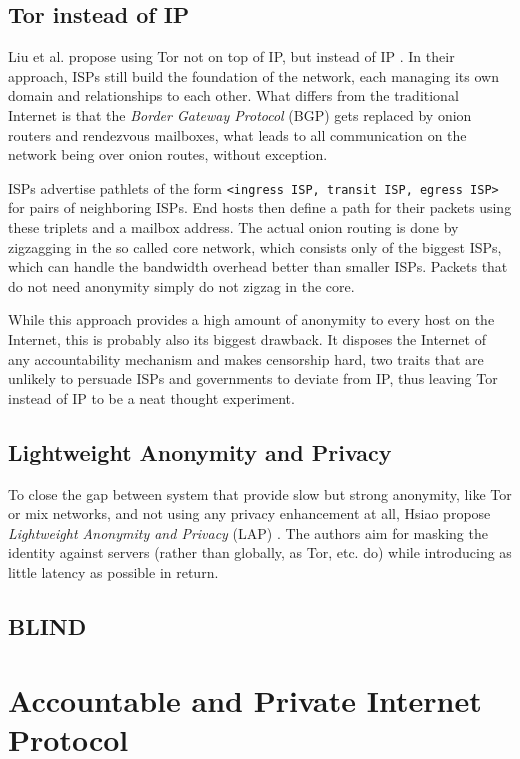 \documentclass{acm_proc_article-sp}
\begin{document}
\subsection{Tor instead of IP}
Liu et al. propose using Tor not on top of IP, but instead of IP \cite{tor}. In their approach, ISPs still build the foundation of the network, each managing its own domain and relationships to each other. What differs from the traditional Internet is that the \emph{Border Gateway Protocol} (BGP) gets replaced by onion routers and rendezvous mailboxes, what leads to all communication on the network being over onion routes, without exception.

ISPs advertise pathlets \cite{pathlet} of the form \texttt{<ingress ISP, transit ISP, egress ISP>} for pairs of neighboring ISPs. End hosts then define a path for their packets using these triplets and a mailbox address. The actual onion routing is done by zigzagging in the so called core network, which consists only of the biggest ISPs, which can handle the bandwidth overhead better than smaller ISPs. Packets that do not need anonymity simply do not zigzag in the core.

While this approach provides a high amount of anonymity to every host on the Internet, this is probably also its biggest drawback. It disposes the Internet of any accountability mechanism and makes censorship hard, two traits that are unlikely to persuade ISPs and governments to deviate from IP, thus leaving Tor instead of IP to be a neat thought experiment.
\subsection{Lightweight Anonymity and Privacy}
To close the gap between system that provide slow but strong anonymity, like Tor or mix networks, and not using any privacy enhancement at all, Hsiao propose \emph{Lightweight Anonymity and Privacy} (LAP) \cite{lap}. The authors aim for masking the identity against servers (rather than globally, as Tor, etc. do) while introducing as little latency as possible in return.
\subsection{BLIND}
\cite{blind}  

\section{Accountable and Private Internet Protocol}
\label{sec:apip}
\end{document}
